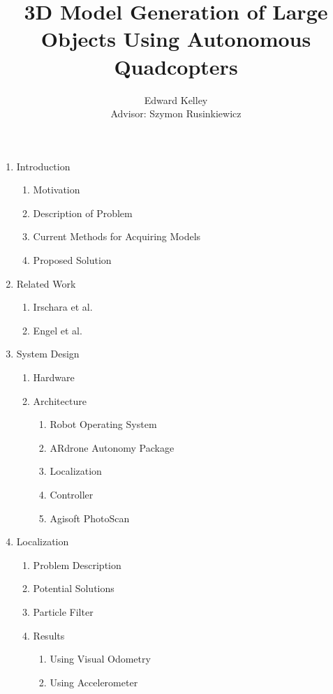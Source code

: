 \documentclass[pageno]{jpaper}
\begin{document}
\title{3D Model Generation of Large Objects Using Autonomous Quadcopters}
\author{Edward Kelley \\
        Advisor: Szymon Rusinkiewicz
}

\date{}
\maketitle

\thispagestyle{empty}


\begin{enumerate}
\item Introduction
	\begin{enumerate}
		\item Motivation
		\item Description of Problem
		\item Current Methods for Acquiring Models
		\item Proposed Solution
	\end{enumerate}
\item Related Work
	\begin{enumerate}
		\item Irschara et al.
		\item Engel et al.
	\end{enumerate}
\item System Design
	\begin{enumerate}
		\item Hardware
		\item Architecture
			\begin{enumerate}
				\item Robot Operating System
				\item ARdrone Autonomy Package
				\item Localization
				\item Controller
				\item Agisoft PhotoScan
			\end{enumerate}
	\end{enumerate}
\item Localization
	\begin{enumerate}
		\item Problem Description
		\item Potential Solutions
		\item Particle Filter
		\item Results
			\begin{enumerate}
				\item Using Visual Odometry
				\item Using Accelerometer

\end{enumerate}
\end{enumerate}
\end{enumerate}
\end{document}
